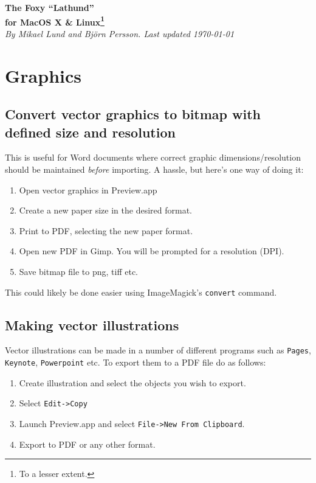 \documentclass[a4paper,10pt]{article}
\begin{document}
\renewcommand{\thefootnote}{\fnsymbol{footnote}}%

\begin{center}
\Huge
\textbf{The Foxy ``Lathund''\\ for MacOS X \& Linux\footnote[2]{To a lesser extent.}}\\
\normalsize
\vspace{0.5cm}
\emph{By Mikael Lund and Bj\"orn Persson.
Last updated \today}
\end{center}

\tableofcontents


\section{Graphics}
\subsection{Convert vector graphics to bitmap with defined size and resolution}
This is useful for Word documents where correct graphic dimensions/resolution should be maintained \emph{before} importing. A hassle, but here's one way of doing it:
\begin{enumerate}
\item Open vector graphics in Preview.app
\item Create a new paper size in the desired format.
\item Print to PDF, selecting the new paper format.
\item Open new PDF in Gimp. You will be prompted for a resolution (DPI).
\item Save bitmap file to png, tiff etc.
\end{enumerate}
This could likely be done easier using ImageMagick's \verb"convert" command.

\subsection{Making vector illustrations}
Vector illustrations can be made in a number of different programs such as
\verb+Pages+, \verb+Keynote+, \verb+Powerpoint+ etc. To export them to a PDF file do as follows:
\begin{enumerate}
\item Create illustration and select the objects you wish to export.
\item Select \verb+Edit->Copy+
\item Launch Preview.app and select \verb+File->New From Clipboard+.
\item Export to PDF or any other format.
\end{enumerate}
\end{document}
